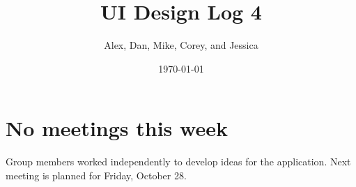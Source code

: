 \documentclass{article}
\title{UI Design Log 4}
\author{Alex, Dan, Mike, Corey, and Jessica}
\date{\today}
\begin{document}
\maketitle
\section{No meetings this week}
Group members worked independently to develop ideas for the application. Next
meeting is planned for Friday, October 28.
\end{document}
